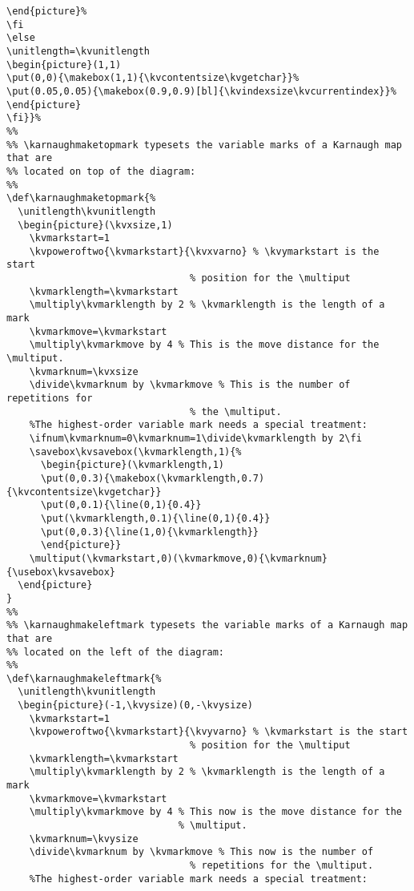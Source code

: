 \documentclass{article}
\begin{document}
\begin{verbatim}
\end{picture}%
\fi
\else
\unitlength=\kvunitlength
\begin{picture}(1,1)
\put(0,0){\makebox(1,1){\kvcontentsize\kvgetchar}}%
\put(0.05,0.05){\makebox(0.9,0.9)[bl]{\kvindexsize\kvcurrentindex}}%
\end{picture}
\fi}}%
%%
%% \karnaughmaketopmark typesets the variable marks of a Karnaugh map that are
%% located on top of the diagram:
%%
\def\karnaughmaketopmark{%
  \unitlength\kvunitlength
  \begin{picture}(\kvxsize,1)
    \kvmarkstart=1
    \kvpoweroftwo{\kvmarkstart}{\kvxvarno} % \kvymarkstart is the start 
                                % position for the \multiput
    \kvmarklength=\kvmarkstart 
    \multiply\kvmarklength by 2 % \kvmarklength is the length of a mark
    \kvmarkmove=\kvmarkstart 
    \multiply\kvmarkmove by 4 % This is the move distance for the \multiput.
    \kvmarknum=\kvxsize
    \divide\kvmarknum by \kvmarkmove % This is the number of repetitions for
                                % the \multiput.  
    %The highest-order variable mark needs a special treatment:
    \ifnum\kvmarknum=0\kvmarknum=1\divide\kvmarklength by 2\fi 
    \savebox\kvsavebox(\kvmarklength,1){% 
      \begin{picture}(\kvmarklength,1)
      \put(0,0.3){\makebox(\kvmarklength,0.7){\kvcontentsize\kvgetchar}} 
      \put(0,0.1){\line(0,1){0.4}} 
      \put(\kvmarklength,0.1){\line(0,1){0.4}}
      \put(0,0.3){\line(1,0){\kvmarklength}} 
      \end{picture}}
    \multiput(\kvmarkstart,0)(\kvmarkmove,0){\kvmarknum}{\usebox\kvsavebox}
  \end{picture}
}
%%
%% \karnaughmakeleftmark typesets the variable marks of a Karnaugh map that are
%% located on the left of the diagram:
%%
\def\karnaughmakeleftmark{%
  \unitlength\kvunitlength
  \begin{picture}(-1,\kvysize)(0,-\kvysize)
    \kvmarkstart=1
    \kvpoweroftwo{\kvmarkstart}{\kvyvarno} % \kvmarkstart is the start 
                                % position for the \multiput
    \kvmarklength=\kvmarkstart 
    \multiply\kvmarklength by 2 % \kvmarklength is the length of a mark
    \kvmarkmove=\kvmarkstart 
    \multiply\kvmarkmove by 4 % This now is the move distance for the
                              % \multiput. 
    \kvmarknum=\kvysize
    \divide\kvmarknum by \kvmarkmove % This now is the number of 
                                % repetitions for the \multiput.  
    %The highest-order variable mark needs a special treatment:

\end{verbatim}
\end{document}
